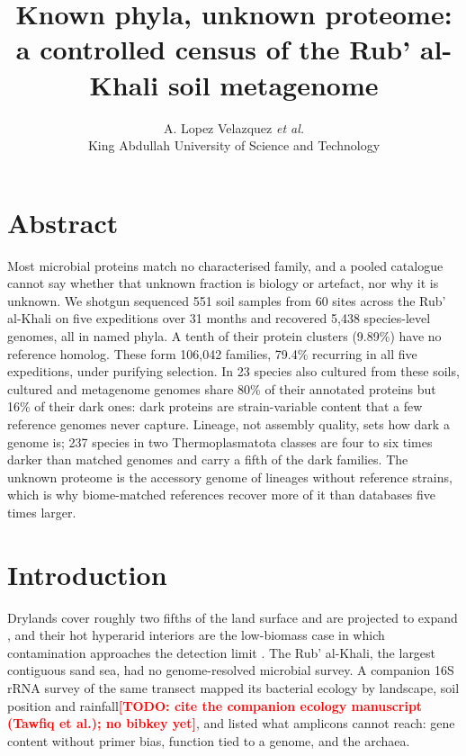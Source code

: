 \documentclass[11pt]{article}
\title{\textbf{Known phyla, unknown proteome:\\ a controlled census of the Rub' al-Khali soil metagenome}}
\author{A. Lopez Velazquez \textit{et al.}\\ \small King Abdullah University of Science and Technology}
\date{}
\providecommand{\todo}[1]{\textcolor{red}{\textbf{[TODO: #1]}}}
\begin{document}
\maketitle

\section*{Abstract}
Most microbial proteins match no characterised family, and a pooled catalogue cannot say whether
that unknown fraction is biology or artefact, nor why it is unknown. We shotgun sequenced 551 soil
samples from 60 sites across the Rub' al-Khali on five expeditions over 31 months and recovered
5{,}438 species-level genomes, all in named phyla. A tenth of their protein clusters (9.89\%) have
no reference homolog. These form 106{,}042 families, 79.4\% recurring in all five expeditions,
under purifying selection. In 23 species also cultured from these soils, cultured and metagenome
genomes share 80\% of their annotated proteins but 16\% of their dark ones: dark proteins are
strain-variable content that a few reference genomes never capture.
Lineage, not assembly quality, sets how dark a genome is; 237 species in two Thermoplasmatota
classes are four to six times darker than matched genomes and carry a fifth of the dark families.
The unknown proteome is the accessory genome of lineages without reference strains, which is why
biome-matched references recover more of it than databases five times larger.

\section*{Introduction}

Drylands cover roughly two fifths of the land surface and are projected to expand
\citep{huang2016dryland,maestre2015aridity}, and their hot hyperarid interiors are the low-biomass
case in which contamination approaches the detection limit \citep{contamination2025guidelines}. The
Rub' al-Khali, the largest contiguous sand sea, had no genome-resolved microbial survey. A companion
16S rRNA survey of the same transect mapped its bacterial ecology by landscape, soil position and
rainfall\todo{cite the companion ecology manuscript (Tawfiq et al.); no bibkey yet}, and listed what
amplicons cannot reach: gene content without primer bias, function tied to a genome, and the archaea.
\end{document}
